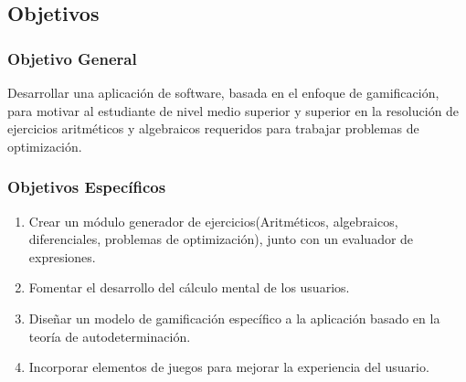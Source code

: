 \documentclass{article}
\begin{document}
\subsection{Objetivos}
\subsubsection{Objetivo General}
Desarrollar  una aplicación de software, basada en el enfoque de gamificación, para motivar al estudiante de nivel medio superior y superior en la resolución de ejercicios aritméticos y algebraicos requeridos para trabajar problemas de  optimización.

\subsubsection{Objetivos Específicos}

\begin{enumerate}
    \item Crear un módulo generador de ejercicios(Aritméticos, algebraicos, diferenciales, problemas de optimización), junto con un evaluador de expresiones.
    \item Fomentar el desarrollo del cálculo mental de los usuarios.
    \item Diseñar un modelo de gamificación específico a la aplicación basado en la teoría de autodeterminación. \item Incorporar elementos de juegos para mejorar la experiencia del usuario.
\end{enumerate}
\end{document}
